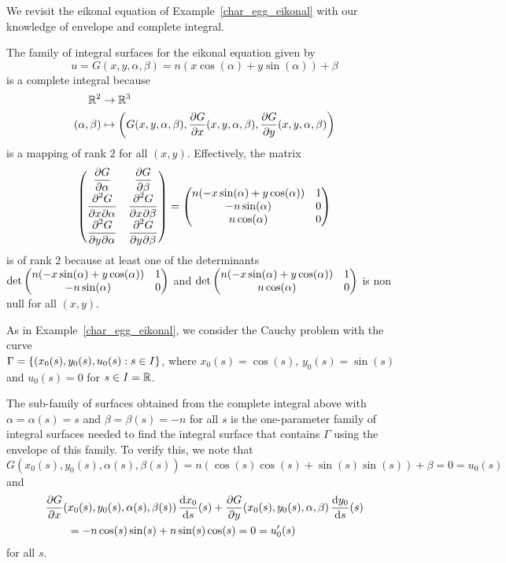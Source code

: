 \begin{egg}
We revisit the eikonal equation of Example~\ref{char_egg_eikonal} with
our knowledge of envelope and complete integral.

The family of integral surfaces for the eikonal equation given by
\[
u = G(x,y,\alpha,\beta) = n(x\cos(\alpha) + y \sin(\alpha)) + \beta
\]
is a complete integral because
\[
\begin{split}
\RR^2 &\rightarrow \RR^3  \\
(\alpha,\beta) &\mapsto \left(G(x,y,\alpha,\beta),
\pdydx{G}{x}(x,y,\alpha,\beta) , \pdydx{G}{y}(x,y,\alpha,\beta) \right)
\end{split}
\]
is a mapping of rank $2$ for all $(x,y)$.  Effectively, the matrix
\[
\begin{pmatrix}
\DS \pdydx{G}{\alpha} & \DS \pdydx{G}{\beta} \\
\DS \pdydxnm{G}{x}{\alpha}{2}{}{} &
\DS \pdydxnm{G}{x}{\beta}{2}{}{} \\
\DS \pdydxnm{G}{y}{\alpha}{2}{}{} &
\DS \pdydxnm{G}{y}{\beta}{2}{}{} \\
\end{pmatrix}
=
\begin{pmatrix}
n(- x\sin(\alpha) + y \cos(\alpha)) & 1 \\
-n\sin(\alpha) & 0 \\
n\cos(\alpha) & 0
\end{pmatrix}
\]
is of rank $2$ because at least one of the determinants
$\DS \det
\begin{pmatrix} n(- x\sin(\alpha) + y \cos(\alpha)) & 1 \\ -n\sin(\alpha) & 0
\end{pmatrix}$
and
$\DS \det
\begin{pmatrix} n(- x\sin(\alpha) + y \cos(\alpha)) & 1 \\ n\cos(\alpha) & 0
\end{pmatrix}$
is non null for all $(x,y)$.

As in Example~\ref{char_egg_eikonal}, we consider the Cauchy problem
with the curve \\
$\DS \Gamma = \left\{ (x_0(s), y_0(s), u_0(s) : s \in I\right\}$,
where $x_0(s)= \cos(s)$, $y_0(s) = \sin(s)$ and $u_0(s)=0$ for $s \in I = \RR$.

The sub-family of surfaces obtained from the complete integral above
with $\alpha = \alpha(s) = s$ and $\beta= \beta(s) = -n$ for all $s$
is the one-parameter family of integral surfaces needed to find the
integral surface that contains $\Gamma$ using the envelope of this
family.  To verify this, we note that
\[
G(x_0(s),y_0(s),\alpha(s),\beta(s)) = n(\cos(s)\cos(s)
+ \sin(s)\sin(s)) + \beta = 0 = u_0(s)
\]
and
\begin{align*}
&\pdydx{G}{x}(x_0(s),y_0(s), \alpha(s), \beta(s))\, \dydx{x_0}{s}(s)
+ \pdydx{G}{y}(x_0(s),y_0(s), \alpha, \beta)\, \dydx{y_0}{s}(s) \\
&\qquad = -n\cos(s)\sin(s) + n \sin(s)\cos(s) = 0 = u_0'(s)
\end{align*}
for all $s$.


\end{egg}

